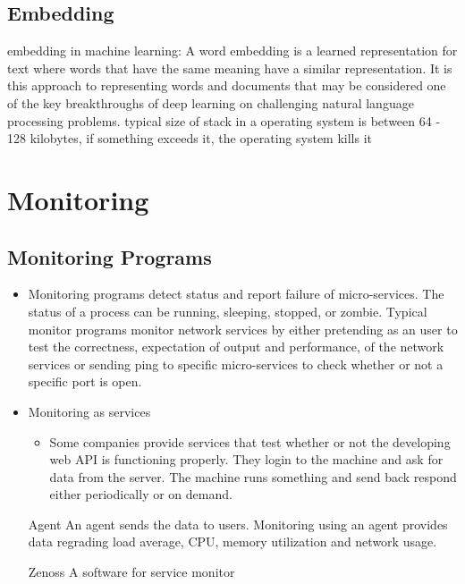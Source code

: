 \documentclass[fancy,11pt,titlestyle=display]{style/elegantbook}
\begin{document}
\section{Embedding}
embedding in machine learning:
A word embedding is a learned representation for text where words that have the same meaning have a similar representation. It is this approach to representing words and documents that may be considered one of the key breakthroughs of deep learning on challenging natural language processing problems.
typical size of stack in a operating system is between 64 - 128 kilobytes, if something exceeds it, the operating system kills it







\chapter{Monitoring}
\section{Monitoring Programs}

    \begin{itemize}
        \item Monitoring programs detect status and report failure of micro-services. The status of a process can be running, sleeping, stopped, or zombie. Typical monitor programs monitor network services by either pretending as an user to test the correctness, expectation of output and performance, of the network services or sending ping to specific micro-services to check whether or not a specific port is open.
            
        \item Monitoring as services
        \begin{itemize}
          \item Some companies provide services that test whether or not the developing web API is functioning properly. They login to the machine and ask for data from the server. The machine runs something and send back respond either periodically or on demand.
        \end{itemize}
        
        \begin{definition}{Agent}{}
        An agent sends the data to users. Monitoring using an agent provides data regrading load average, CPU, memory utilization and network usage.
        \end{definition}
        \begin{definition}{Zenoss}{}
        A software for service monitor
        \end{definition}
    \end{itemize}
    
\end{document}
